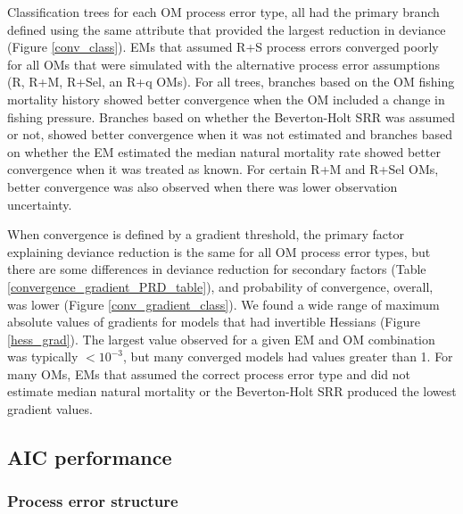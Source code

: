 \documentclass[
  12pt,
]{article}
\begin{document}
Classification trees for each OM process error type, all had the primary
branch defined using the same attribute that provided the largest
reduction in deviance (Figure \ref{conv_class}). EMs that assumed R+S
process errors converged poorly for all OMs that were simulated with the
alternative process error assumptions (R, R+M, R+Sel, an R+q OMs). For
all trees, branches based on the OM fishing mortality history showed
better convergence when the OM included a change in fishing pressure.
Branches based on whether the Beverton-Holt SRR was assumed or not,
showed better convergence when it was not estimated and branches based
on whether the EM estimated the median natural mortality rate showed
better convergence when it was treated as known. For certain R+M and
R+Sel OMs, better convergence was also observed when there was lower
observation uncertainty.

When convergence is defined by a gradient threshold, the primary factor
explaining deviance reduction is the same for all OM process error
types, but there are some differences in deviance reduction for
secondary factors (Table \ref{convergence_gradient_PRD_table}), and
probability of convergence, overall, was lower (Figure
\ref{conv_gradient_class}). We found a wide range of maximum absolute
values of gradients for models that had invertible Hessians (Figure
\ref{hess_grad}). The largest value observed for a given EM and OM
combination was typically \(<10^{-3}\), but many converged models had
values greater than 1. For many OMs, EMs that assumed the correct
process error type and did not estimate median natural mortality or the
Beverton-Holt SRR produced the lowest gradient values.

\subsection*{AIC performance}\label{aic-performance}

\subsubsection*{Process error structure}\label{process-error-structure}
\end{document}
